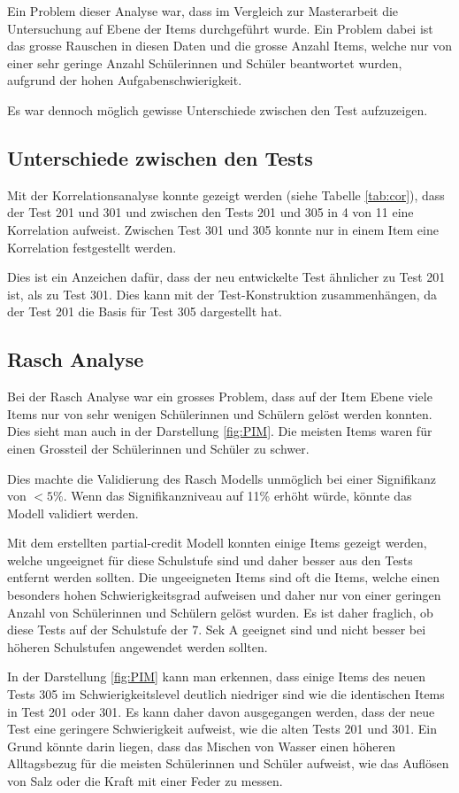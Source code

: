 Ein Problem dieser Analyse war, dass im Vergleich zur Masterarbeit die Untersuchung auf Ebene der Items durchgeführt wurde. Ein Problem dabei ist das grosse Rauschen in diesen Daten und die grosse Anzahl Items, welche nur von einer sehr geringe Anzahl Schülerinnen und Schüler beantwortet wurden, aufgrund der hohen Aufgabenschwierigkeit.

Es war dennoch möglich gewisse Unterschiede zwischen den Test aufzuzeigen.

\subsection{Unterschiede zwischen den Tests}
Mit der Korrelationsanalyse konnte gezeigt werden (siehe Tabelle \ref{tab:cor}), dass der Test 201 und 301 und zwischen den Tests 201 und 305 in 4 von 11 eine Korrelation aufweist. Zwischen Test 301 und 305 konnte nur in einem Item eine Korrelation festgestellt werden.

Dies ist ein Anzeichen dafür, dass der neu entwickelte Test ähnlicher zu Test 201 ist, als zu Test 301. Dies kann mit der Test-Konstruktion zusammenhängen, da der Test 201 die Basis für Test 305 dargestellt hat.

\subsection{Rasch Analyse}

Bei der Rasch Analyse war ein grosses Problem, dass auf der Item Ebene viele Items nur von sehr wenigen Schülerinnen und Schülern gelöst werden konnten. Dies sieht man auch in der Darstellung \ref{fig:PIM}. Die meisten Items waren für einen Grossteil der Schülerinnen und Schüler zu schwer.

Dies machte die Validierung des Rasch Modells unmöglich bei einer Signifikanz von $< 5\%$. Wenn das Signifikanzniveau auf 11\% erhöht würde, könnte das Modell validiert werden. 

Mit dem erstellten partial-credit Modell konnten einige Items gezeigt werden, welche ungeeignet für diese Schulstufe sind und daher besser aus den Tests entfernt werden sollten. Die ungeeigneten Items sind oft die Items, welche einen besonders hohen Schwierigkeitsgrad aufweisen und daher nur von einer geringen Anzahl von Schülerinnen und Schülern gelöst wurden. Es ist daher fraglich, ob diese Tests auf der Schulstufe der 7. Sek A geeignet sind und nicht besser bei höheren Schulstufen angewendet werden sollten.

In der Darstellung \ref{fig:PIM} kann man erkennen, dass einige Items des neuen Tests 305 im Schwierigkeitslevel deutlich niedriger sind wie die identischen Items in Test 201 oder 301. Es kann daher davon ausgegangen werden, dass der neue Test eine geringere Schwierigkeit aufweist, wie die alten Tests 201 und 301. Ein Grund könnte darin liegen, dass das Mischen von Wasser einen höheren Alltagsbezug für die meisten Schülerinnen und Schüler aufweist, wie das Auflösen von Salz oder die Kraft mit einer Feder zu messen. 

